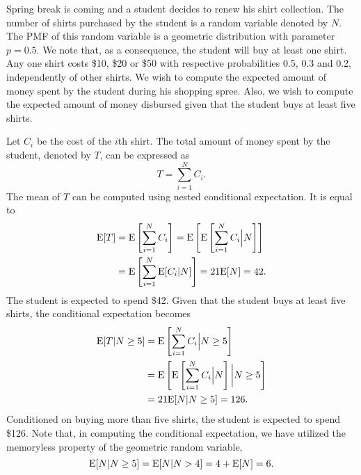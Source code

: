 \begin{example}
Spring break is coming and a student decides to renew his shirt collection.
The number of shirts purchased by the student is a random variable denoted by $N$.
The PMF of this random variable is a geometric distribution with parameter $p = 0.5$.
We note that, as a consequence, the student will buy at least one shirt.
Any one shirt costs \$10, \$20 or \$50 with respective probabilities 0.5, 0.3 and 0.2, independently of other shirts.
We wish to compute the expected amount of money spent by the student during his shopping spree.
Also, we wish to compute the expected amount of money disbursed given that the student buys at least five shirts.

Let $C_i$ be the cost of the $i$th shirt.
The total amount of money spent by the student, denoted by $T$, can be expressed as
\begin{equation*}
T = \sum_{i=1}^N C_i .
\end{equation*}
The mean of $T$ can be computed using nested conditional expectation.
It is equal to
\begin{equation*}
\begin{split}
\mathrm{E} [T] &= \mathrm{E} \left[ \sum_{i=1}^N C_i \right]
= \mathrm{E} \left[ \mathrm{E} \left[
\sum_{i=1}^N C_i \Big| N \right] \right] \\
&= \mathrm{E} \left[ \sum_{i=1}^N \mathrm{E} [ C_i | N ] \right]
= 21 \mathrm{E} [ N ] = 42.
\end{split}
\end{equation*}
The student is expected to spend \$42.
Given that the student buys at least five shirts, the conditional expectation becomes
\begin{equation*}
\begin{split}
\mathrm{E} [T | N \geq 5]
&= \mathrm{E} \left[ \sum_{i=1}^N C_i \Big| N \geq 5 \right] \\
&= \mathrm{E} \left[ \mathrm{E} \left[
\sum_{i=1}^N C_i \Big| N \right] \bigg| N \geq 5 \right] \\
&= 21 \mathrm{E} [ N | N \geq 5]
= 126 .
\end{split}
\end{equation*}
Conditioned on buying more than five shirts, the student is expected to spend \$126.
Note that, in computing the conditional expectation, we have utilized the memoryless property of the geometric random variable,
\begin{equation*}
\mathrm{E} [ N | N \geq 5] = \mathrm{E} [ N | N > 4] = 4 + \mathrm{E} [ N ] = 6 .
\end{equation*}
\end{example}


